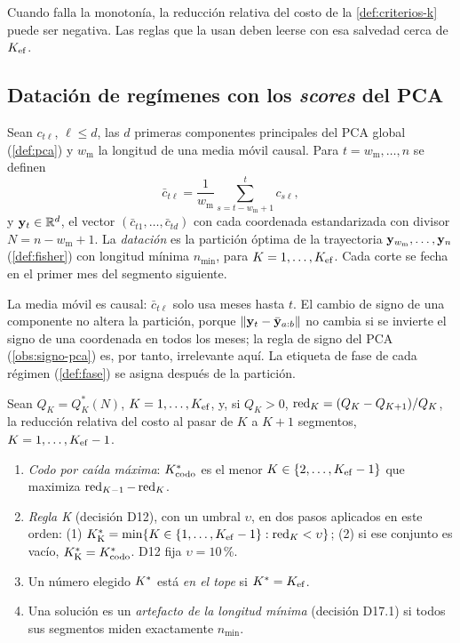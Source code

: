 Cuando falla la monotonía, la reducción relativa del costo de la \cref{def:criterios-k} puede ser
negativa. Las reglas que la usan deben leerse con esa salvedad cerca de $K_{\mathrm{ef}}$.

\subsection{Datación de regímenes con los \emph{scores} del PCA}
\label{sec:datacion}

\begin{definicion}\label{def:datacion}
Sean $c_{t\ell}$, $\ell\le d$, las $d$ primeras componentes principales del PCA global
(\cref{def:pca}) y $w_{\mathrm m}$ la longitud de una media móvil causal. Para
$t=w_{\mathrm m},\dots,n$ se definen
\[
  \bar c_{t\ell}=\frac{1}{w_{\mathrm m}}\sum_{s=t-w_{\mathrm m}+1}^{t}c_{s\ell},
\]
y $\mathbf{y}_t\in\mathbb{R}^d$, el vector $(\bar c_{t1},\dots,\bar c_{td})$ con cada coordenada estandarizada con
divisor $N=n-w_{\mathrm m}+1$. La \emph{datación} es la partición óptima de la trayectoria
$\mathbf{y}_{w_{\mathrm m}},\dots,\mathbf{y}_n$ (\cref{def:fisher}) con longitud mínima $n_{\min}$, para
$K=1,\dots,K_{\mathrm{ef}}$. Cada corte se fecha en el primer mes del segmento siguiente.
\end{definicion}

La media móvil es causal: $\bar c_{t\ell}$ solo usa meses hasta $t$. El cambio de signo de una
componente no altera la partición, porque $\lVert \mathbf{y}_t-\bar{\mathbf{y}}_{a:b}\rVert$ no cambia si se invierte el
signo de una coordenada en todos los meses; la regla de signo del PCA
(\cref{obs:signo-pca}) es, por tanto, irrelevante aquí. La etiqueta de fase de cada régimen
(\cref{def:fase}) se asigna después de la partición.

\begin{definicion}\label{def:criterios-k}
Sean $Q_K=Q^\ast_K(N)$, $K=1,\dots,K_{\mathrm{ef}}$, y, si $Q_K>0$,
$\operatorname{red}_K=(Q_K-Q_{K+1})/Q_K$, la reducción relativa del costo al pasar de $K$ a $K+1$ segmentos,
$K=1,\dots,K_{\mathrm{ef}}-1$.
\begin{enumerate}[label=(\alph*)]
  \item \emph{Codo por caída máxima}: $K^{\ast}_{\mathrm{codo}}$ es el menor
    $K\in\{2,\dots,K_{\mathrm{ef}}-1\}$ que maximiza $\operatorname{red}_{K-1}-\operatorname{red}_K$.
  \item \emph{Regla K} (decisión D12), con un umbral $\upsilon$, en dos pasos aplicados en este
    orden: (1) $K^{\ast}_{\mathrm K}=\min\{K\in\{1,\dots,K_{\mathrm{ef}}-1\}:\operatorname{red}_K<\upsilon\}$; (2) si ese
    conjunto es vacío, $K^{\ast}_{\mathrm K}=K^{\ast}_{\mathrm{codo}}$. D12 fija $\upsilon=10$\,\%.
  \item Un número elegido $K^{\ast}$ está \emph{en el tope} si $K^{\ast}=K_{\mathrm{ef}}$.
  \item Una solución es un \emph{artefacto de la longitud mínima} (decisión D17.1) si todos sus
    segmentos miden exactamente $n_{\min}$.
\end{enumerate}
\end{definicion}

